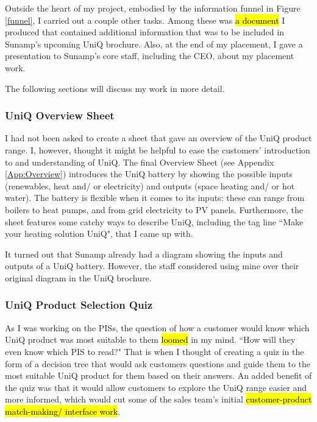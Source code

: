 Outside the heart of my project, embodied by the information funnel in Figure \ref{funnel}, I carried out a couple other tasks.
Among these was \hl{a document} I produced that contained additional information that was to be included in Sunamp's upcoming UniQ brochure.
Also, at the end of my placement, I gave a presentation to Sunamp's core staff, including the CEO, about my placement work.

The following sections will discuss my work in more detail.



\subsubsection{UniQ Overview Sheet}

I had not been asked to create a sheet that gave an overview of the UniQ product range.
I, however, thought it might be helpful to ease the customers' introduction to and understanding of UniQ.
The final Overview Sheet (see Appendix \ref{App:Overview}) introduces the UniQ battery by showing the possible inputs (renewables, heat and/ or electricity) and outputs (space heating and/ or hot water).
The battery is flexible when it comes to its inputs: these can range from boilers to heat pumps, and from grid electricity to PV panels.
Furthermore, the sheet features some catchy ways to describe UniQ, including the tag line ``Make your heating solution UniQ", that I came up with.

It turned out that Sunamp already had a diagram showing the inputs and outputs of a UniQ battery.
However, the staff considered using mine over their original diagram in the UniQ brochure.



\subsubsection{UniQ Product Selection Quiz} \label{sec:quiz}

As I was working on the PISs, the question of how a customer would know which UniQ product was most suitable to them \hl{loomed} in my mind.
``How will they even know which PIS to read?"
That is when I thought of creating a quiz in the form of a decision tree that would ask customers questions and guide them to the most suitable UniQ product for them based on their answers.
An added benefit of the quiz was that it would allow customers to explore the UniQ range easier and more informed, which would cut some of the sales team's initial \hl{customer-product match-making/ interface work}.

